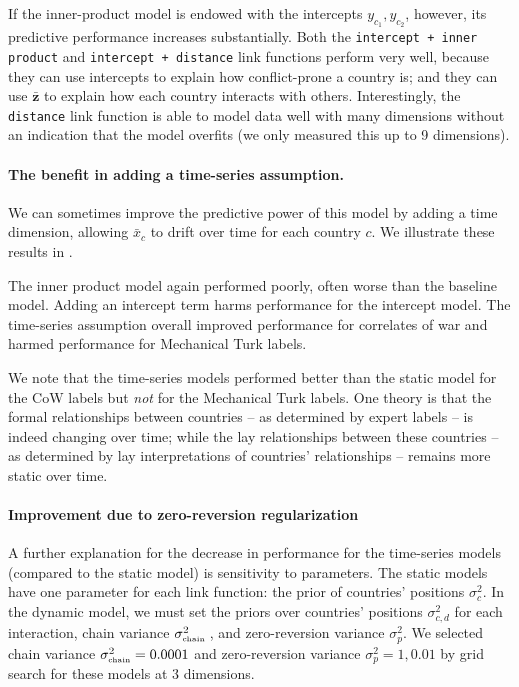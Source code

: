 If the inner-product model is endowed with the intercepts $y_{c_1},
y_{c_2}$, however, its predictive performance increases substantially.
Both the \verb!intercept + inner product! and
\verb!intercept + distance! link functions perform very well, because
they can use intercepts to explain how conflict-prone a country is;
and they can use $\bm \bar z$ to explain how each country interacts
with others.  Interestingly, the \verb!distance! link function is able
to model data well with many dimensions without an indication that the
model overfits (we only measured this up to 9 dimensions).

\paragraph{The benefit in adding a time-series assumption.}
We can sometimes improve the predictive power of this model by adding
a time dimension, allowing $\bar x_c$ to drift over time for each
country $c$.  We illustrate these results in
.

The inner product model again performed poorly, often worse than the
baseline model.  Adding an intercept term harms performance for the
intercept model.  The time-series assumption overall improved
performance for correlates of war and harmed performance for
Mechanical Turk labels.

We note that the time-series models performed better than the static
model for the CoW labels but \emph{not} for the Mechanical Turk
labels.  One theory is that the formal relationships between countries
-- as determined by expert labels -- is indeed changing over time;
while the lay relationships between these countries -- as determined
by lay interpretations of countries' relationships -- remains more
static over time.

\paragraph{Improvement due to zero-reversion regularization}
A further explanation for the decrease in performance for the
time-series models (compared to the static model) is sensitivity to
parameters.  The static models have one parameter for each link
function: the prior of countries' positions $\sigma_{c}^2$.  In the
dynamic model, we must set the priors over countries' positions
$\sigma_{c,d}^2$ for each interaction, chain variance
$\sigma_{\mbox{\tiny chain }}^2$, and zero-reversion variance
$\sigma_{p}^2$.  We selected chain variance $\sigma_{\mbox{\tiny
    chain}}^2=0.0001$ and zero-reversion variance $\sigma_p^2=1,0.01$
by grid search for these models at $3$ dimensions.

